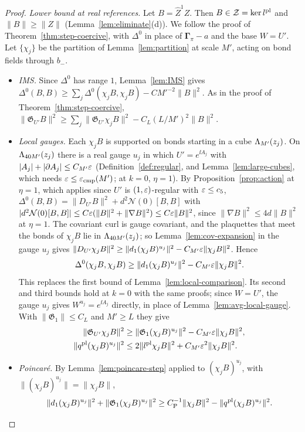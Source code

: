 \begin{proof}
\emph{Lower bound at real references.} Let $B=\hat Z^1Z$. Then $B\in\mathcal Z=\ker l^{\rm pl}$ and $\|B\|\ge\|Z\|$ (Lemma~\ref{lem:eliminate}(d)). We follow the proof of Theorem~\ref{thm:step-coercive}, with $\Delta^0$ in place of $\boldsymbol\Gamma_\pi-a$ and the base $W=U'$. Let $\{\chi_j\}$ be the partition of Lemma~\ref{lem:partition} at scale $M'$, acting on bond fields through $b_-$.
\begin{itemize}
\item \emph{IMS.} Since $\Delta^0$ has range $1$, Lemma~\ref{lem:IMS} gives $\Delta^0(B,B)\ge\sum_j\Delta^0(\chi_jB,\chi_jB)-CM'^{-2}\|B\|^2$. As in the proof of Theorem~\ref{thm:step-coercive}, $\|\mathfrak G_{U'}B\|^2\ge\sum_j\|\mathfrak G_{U'}\chi_jB\|^2-C_L(L/M')^2\|B\|^2$.
\item \emph{Local gauges.} Each $\chi_jB$ is supported on bonds starting in a cube $\Lambda_{M'}(z_j)$. On $\Lambda_{40M'}(z_j)$ there is a real gauge $u_j$ in which $U'=e^{\ii A_j}$ with $|A_j|+|\partial A_j|\le C_{M'}\varepsilon$ (Definition~\ref{def:regular}, and Lemma~\ref{lem:large-cubes}, which needs $\varepsilon\le\varepsilon_{\rm cmp}(M')$; at $k=0$, $\eta=1$). By Proposition~\ref{prop:action} at $\eta=1$, which applies since $U'$ is $(1,\varepsilon)$-regular with $\varepsilon\le c_5$, $\Delta^0(B,B)=\|D_{U'}B\|^2+d^2\mathcal N(0)[B,B]$ with $|d^2\mathcal N(0)[B,B]|\le C\varepsilon(\|B\|^2+\|\nabla B\|^2)\le C\varepsilon\|B\|^2$, since $\|\nabla B\|^2\le4d\|B\|^2$ at $\eta=1$. The covariant curl is gauge covariant, and the plaquettes that meet the bonds of $\chi_jB$ lie in $\Lambda_{40M'}(z_j)$; so Lemma~\ref{lem:cov-expansion} in the gauge $u_j$ gives $\|D_{U'}\chi_jB\|^2\ge\|d_1(\chi_jB)^{u_j}\|^2-C_{M'}\varepsilon\|\chi_jB\|^2$. Hence
\[
\Delta^0(\chi_jB,\chi_jB)\ge\|d_1(\chi_jB)^{u_j}\|^2-C_{M'}\varepsilon\|\chi_jB\|^2 .
\]
This replaces the first bound of Lemma~\ref{lem:local-comparison}. Its second and third bounds hold at $k=0$ with the same proofs; since $W=U'$, the gauge $u_j$ gives $W^{u_j}=e^{\ii A_j}$ directly, in place of Lemma~\ref{lem:avg-local-gauge}. With $\|\mathfrak G_1\|\le C_L$ and $M'\ge L$ they give
\[
\begin{aligned}
\|\mathfrak G_{U'}\chi_jB\|^2&\ge\|\mathfrak G_1(\chi_jB)^{u_j}\|^2-C_{M'}\varepsilon\|\chi_jB\|^2,\\
\|q^{\rm pl}(\chi_jB)^{u_j}\|^2&\le2\|l^{\rm pl}\chi_jB\|^2+C_{M'}\varepsilon^2\|\chi_jB\|^2 .
\end{aligned}
\]
\item \emph{Poincar\'e.} By Lemma~\ref{lem:poincare-step} applied to $(\chi_jB)^{u_j}$, with $\|(\chi_jB)^{u_j}\|=\|\chi_jB\|$,
\[
\|d_1(\chi_jB)^{u_j}\|^2+\|\mathfrak G_1(\chi_jB)^{u_j}\|^2\ge C_{\rm P}^{-1}\|\chi_jB\|^2-\|q^{\rm pl}(\chi_jB)^{u_j}\|^2 .
\]
\end{itemize}
\end{proof}
